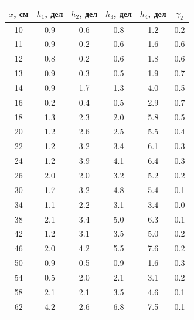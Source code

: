 \documentclass[a4paper, 12pt]{article}%
\begin{document}
\begin{table}[H]
\begin{tabular}{|c|c|c|c|c|c|}
\hline
$x$, см & $h_1$, дел & $h_2$, дел & $h_3$, дел & $h_4$, дел & $\gamma_2$ \\ \hline
10      & 0.9        & 0.6        & 0.8        & 1.2        & 0.2       \\ \hline
11      & 0.9        & 0.2        & 0.6        & 1.6        & 0.6       \\ \hline
12      & 0.8        & 0.2        & 0.6        & 1.8        & 0.6       \\ \hline
13      & 0.9        & 0.3        & 0.5        & 1.9        & 0.7       \\ \hline
14      & 0.9        & 1.7        & 1.3        & 4.0        & 0.5       \\ \hline
16      & 0.2        & 0.4        & 0.5        & 2.9        & 0.7       \\ \hline
18      & 1.3        & 2.3        & 2.0        & 5.8        & 0.5       \\ \hline
20      & 1.2        & 2.6        & 2.5        & 5.5        & 0.4       \\ \hline
22      & 1.2        & 3.2        & 3.4        & 6.1        & 0.3       \\ \hline
24      & 1.2        & 3.9        & 4.1        & 6.4        & 0.3       \\ \hline
26      & 2.0        & 2.0        & 3.2        & 5.2        & 0.2       \\ \hline
30      & 1.7        & 3.2        & 4.8        & 5.4        & 0.1       \\ \hline
34      & 1.1        & 2.2        & 3.1        & 3.4        & 0.0       \\ \hline
38      & 2.1        & 3.4        & 5.0        & 6.3        & 0.1       \\ \hline
42      & 1.2        & 3.1        & 3.5        & 5.0        & 0.2       \\ \hline
46      & 2.0        & 4.2        & 5.5        & 7.6        & 0.2       \\ \hline
50      & 0.9        & 0.5        & 0.9        & 1.6        & 0.3       \\ \hline
54      & 0.5        & 2.0        & 2.1        & 3.1        & 0.2       \\ \hline
58      & 2.1        & 2.1        & 3.5        & 4.6        & 0.1       \\ \hline
62      & 4.2        & 2.6        & 6.8        & 7.5        & 0.1       \\ \hline

\end{tabular}
\end{table}
\end{document}
